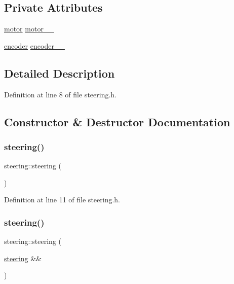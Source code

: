 \subsection*{Private Attributes}
\begin{DoxyCompactItemize}
\item 
\mbox{\hyperlink{classmotor}{motor}} \mbox{\hyperlink{classsteering_ae6f1468c34059bfeecec645f6a51971a}{motor\+\_\+\+\_\+}}
\item 
\mbox{\hyperlink{classencoder}{encoder}} \mbox{\hyperlink{classsteering_a59f627a3b0b3cbb4ee083c3233ea6640}{encoder\+\_\+\+\_\+}}
\end{DoxyCompactItemize}


\subsection{Detailed Description}


Definition at line 8 of file steering.\+h.



\subsection{Constructor \& Destructor Documentation}
\mbox{\label{classsteering_a55383df3b5eb0bbd66cd9ef76c82b588}} 
\subsubsection{\texorpdfstring{steering()}{steering()}\hspace{0.1cm}{\footnotesize\ttfamily [1/3]}}
{\footnotesize\ttfamily steering\+::steering (\begin{DoxyParamCaption}{ }\end{DoxyParamCaption})\hspace{0.3cm}{\ttfamily [inline]}}



Definition at line 11 of file steering.\+h.

\mbox{\label{classsteering_ac941b5d9c6daae87122f984819606475}} 
\subsubsection{\texorpdfstring{steering()}{steering()}\hspace{0.1cm}{\footnotesize\ttfamily [2/3]}}
{\footnotesize\ttfamily steering\+::steering (\begin{DoxyParamCaption}\item[{\mbox{\hyperlink{classsteering}{steering}} \&\&}]{ }\end{DoxyParamCaption})\hspace{0.3cm}{\ttfamily [default]}}

